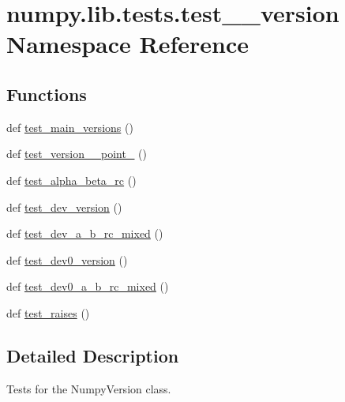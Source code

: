 \hypertarget{namespacenumpy_1_1lib_1_1tests_1_1test____version}{}\section{numpy.\+lib.\+tests.\+test\+\_\+\+\_\+version Namespace Reference}
\label{namespacenumpy_1_1lib_1_1tests_1_1test____version}
\subsection*{Functions}
\begin{DoxyCompactItemize}
\item 
def \hyperlink{namespacenumpy_1_1lib_1_1tests_1_1test____version_a39c92b63b0c3eb6fe95ac105d4403462}{test\+\_\+main\+\_\+versions} ()
\item 
def \hyperlink{namespacenumpy_1_1lib_1_1tests_1_1test____version_a9794fd85211eda42f52b25285a88c0ca}{test\+\_\+version\+\_\+\_\+point\+\_} ()
\item 
def \hyperlink{namespacenumpy_1_1lib_1_1tests_1_1test____version_a49e5db06eccab162de69ba82f602cd82}{test\+\_\+alpha\+\_\+beta\+\_\+rc} ()
\item 
def \hyperlink{namespacenumpy_1_1lib_1_1tests_1_1test____version_aef61d40a2173bfc88c7c39789fd72107}{test\+\_\+dev\+\_\+version} ()
\item 
def \hyperlink{namespacenumpy_1_1lib_1_1tests_1_1test____version_a1938121af13a1aecf0987e10ff79310a}{test\+\_\+dev\+\_\+a\+\_\+b\+\_\+rc\+\_\+mixed} ()
\item 
def \hyperlink{namespacenumpy_1_1lib_1_1tests_1_1test____version_a47cfd321b10ffb6cd7496d657c0ef548}{test\+\_\+dev0\+\_\+version} ()
\item 
def \hyperlink{namespacenumpy_1_1lib_1_1tests_1_1test____version_a2142f5e2d4848cc7f58abf6020444a52}{test\+\_\+dev0\+\_\+a\+\_\+b\+\_\+rc\+\_\+mixed} ()
\item 
def \hyperlink{namespacenumpy_1_1lib_1_1tests_1_1test____version_a1042f35f9a606675f5c551f24e6f6220}{test\+\_\+raises} ()
\end{DoxyCompactItemize}


\subsection{Detailed Description}
\begin{DoxyVerb}Tests for the NumpyVersion class.\end{DoxyVerb}
 

